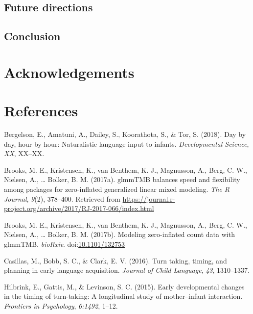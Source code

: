 \documentclass[floatsintext,man]{apa6}
\theoremstyle{definition}
\theoremstyle{definition}
\theoremstyle{definition}
\theoremstyle{remark}
\begin{document}
\subsection{Future directions}\label{disc-future}

\subsection{Conclusion}\label{disc-conclusion}

\section{Acknowledgements}\label{acknowledgements}

\newpage

\section{References}\label{refs}

\begingroup
\setlength{\parindent}{-0.5in} \setlength{\leftskip}{0.5in}

\hypertarget{refs}{}
\hypertarget{ref-bergelson2018day}{}
Bergelson, E., Amatuni, A., Dailey, S., Koorathota, S., \& Tor, S.
(2018). Day by day, hour by hour: Naturalistic language input to
infants. \emph{Developmental Science}, \emph{XX}, XX--XX.

\hypertarget{ref-R-glmmTMB}{}
Brooks, M. E., Kristensen, K., van Benthem, K. J., Magnusson, A., Berg,
C. W., Nielsen, A., \ldots{} Bolker, B. M. (2017a). glmmTMB balances
speed and flexibility among packages for zero-inflated generalized
linear mixed modeling. \emph{The R Journal}, \emph{9}(2), 378--400.
Retrieved from
\url{https://journal.r-project.org/archive/2017/RJ-2017-066/index.html}

\hypertarget{ref-brooks2017modeling}{}
Brooks, M. E., Kristensen, K., van Benthem, K. J., Magnusson, A., Berg,
C. W., Nielsen, A., \ldots{} Bolker, B. M. (2017b). Modeling
zero-inflated count data with glmmTMB. \emph{bioRxiv}.
doi:\href{https://doi.org/10.1101/132753}{10.1101/132753}

\hypertarget{ref-casillas2016turn}{}
Casillas, M., Bobb, S. C., \& Clark, E. V. (2016). Turn taking, timing,
and planning in early language acquisition. \emph{Journal of Child
Language}, \emph{43}, 1310--1337.

\hypertarget{ref-hilbrink2015early}{}
Hilbrink, E., Gattis, M., \& Levinson, S. C. (2015). Early developmental
changes in the timing of turn-taking: A longitudinal study of
mother--infant interaction. \emph{Frontiers in Psychology},
\emph{6:1492}, 1--12.
\end{document}
